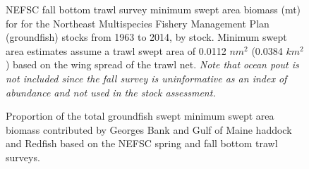 	\begin{figure}
		\centering	
		\captionsetup{singlelinecheck=off}
		\caption[.]{NEFSC fall bottom trawl survey minimum swept area biomass (mt) for for the Northeast Multispecies Fishery Management Plan (groundfish) stocks from 1963 to 2014, by stock. Minimum swept area estimates assume a trawl swept area of 0.0112 $nm^{2}$ (0.0384 $km^{2}$) based on the wing spread of the trawl net. \textit{Note that ocean pout is not included since the fall survey is uninformative as an index of abundance and not used in the stock assessment.}	}
		\label{nefscFallMinSweptAreaBiomass}
	\end{figure}
	\clearpage


	\begin{figure}
		\centering	
		\captionsetup{singlelinecheck=off}
		\caption[.]{Proportion of the total groundfish swept minimum swept area biomass contributed by Georges Bank and Gulf of Maine haddock and Redfish based on the NEFSC spring and fall bottom trawl surveys.}
		\label{propBiomassHaddockRedfish}
	\end{figure}
	\clearpage


\clearpage
